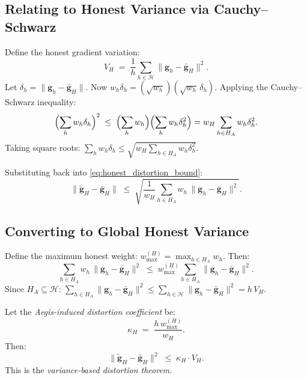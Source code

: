 \documentclass[../main]{subfiles}
\begin{document}
\subsection{Relating to Honest Variance via Cauchy--Schwarz}

Define the honest gradient variation:
\begin{equation}
    V_H \;=\; \frac{1}{h}\sum_{h \in \mathcal{H}} \|\mathbf{g}_h - \bar{\mathbf{g}}_H\|^2.
    \label{eq:honest_variation}
\end{equation}
Let $\delta_h = \|\mathbf{g}_h - \bar{\mathbf{g}}_H\|$.
Now $w_h \delta_h = (\sqrt{w_h})(\sqrt{w_h}\,\delta_h)$.
Applying the Cauchy--Schwarz inequality:
\[
    \Bigl(\sum_h w_h \delta_h\Bigr)^2
    \;\leq\; \Bigl(\sum_h w_h\Bigr)\Bigl(\sum_h w_h \delta_h^2\Bigr)
    = w_H \sum_{h \in H_A} w_h \delta_h^2.
\]
Taking square roots:
$\sum_h w_h \delta_h \leq \sqrt{w_H \sum_{h \in H_A} w_h \delta_h^2}$.

Substituting back into \eqref{eq:honest_distortion_bound}:
\begin{equation}
    \|\widetilde{\mathbf{g}}_H - \bar{\mathbf{g}}_H\| \;\leq\;
    \sqrt{\frac{1}{w_H}\sum_{h \in H_A} w_h\,\|\mathbf{g}_h - \bar{\mathbf{g}}_H\|^2}.
    \label{eq:distortion_cs}
\end{equation}
\subsection{Converting to Global Honest Variance}

Define the maximum honest weight: $w_{\max}^{(H)} = \max_{h \in H_A} w_h$.
Then:
\[
    \sum_{h \in H_A} w_h\,\|\mathbf{g}_h - \bar{\mathbf{g}}_H\|^2
    \;\leq\; w_{\max}^{(H)}\sum_{h \in H_A} \|\mathbf{g}_h - \bar{\mathbf{g}}_H\|^2.
\]
Since $H_A \subseteq \mathcal{H}$:
$\sum_{h \in H_A} \|\mathbf{g}_h - \bar{\mathbf{g}}_H\|^2 \leq \sum_{h \in \mathcal{H}} \|\mathbf{g}_h - \bar{\mathbf{g}}_H\|^2 = h\, V_H$.

Let the \emph{Aegis-induced distortion coefficient} be:
\begin{equation}
    \kappa_H \;=\; \frac{h\, w_{\max}^{(H)}}{w_H}.
    \label{eq:kappa_H}
\end{equation}
Then:
\begin{equation}
    \boxed{\|\widetilde{\mathbf{g}}_H - \bar{\mathbf{g}}_H\|^2 \;\leq\; \kappa_H \cdot V_H.}
    \label{eq:variance_distortion}
\end{equation}
This is the \emph{variance-based distortion theorem}.
\end{document}
